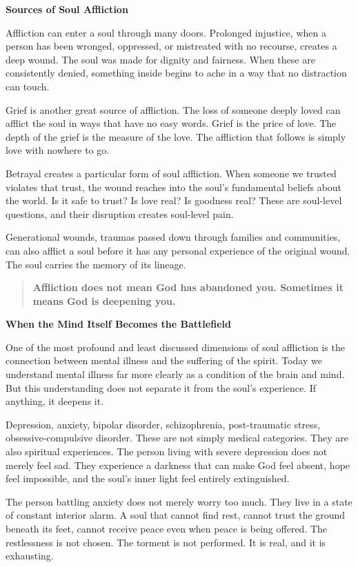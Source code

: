 \textbf{Sources of Soul Affliction}

Affliction can enter a soul through many doors. Prolonged injustice,
when a person has been wronged, oppressed, or mistreated with no
recourse, creates a deep wound. The soul was made for dignity and
fairness. When these are consistently denied, something inside begins to
ache in a way that no distraction can touch.

Grief is another great source of affliction. The loss of someone deeply
loved can afflict the soul in ways that have no easy words. Grief is the
price of love. The depth of the grief is the measure of the love. The
affliction that follows is simply love with nowhere to go.

Betrayal creates a particular form of soul affliction. When someone we
trusted violates that trust, the wound reaches into the soul's
fundamental beliefs about the world. Is it safe to trust? Is love real?
Is goodness real? These are soul-level questions, and their disruption
creates soul-level pain.

Generational wounds, traumas passed down through families and
communities, can also afflict a soul before it has any personal
experience of the original wound. The soul carries the memory of its
lineage.

\begin{quote}
\textbf{Affliction does not mean God has abandoned you. Sometimes it
means God is deepening you.}
\end{quote}

\textbf{When the Mind Itself Becomes the Battlefield}

One of the most profound and least discussed dimensions of soul
affliction is the connection between mental illness and the suffering of
the spirit. Today we understand mental illness far more clearly as a
condition of the brain and mind. But this understanding does not
separate it from the soul's experience. If anything, it deepens it.

Depression, anxiety, bipolar disorder, schizophrenia, post-traumatic
stress, obsessive-compulsive disorder. These are not simply medical
categories. They are also spiritual experiences. The person living with
severe depression does not merely feel sad. They experience a darkness
that can make God feel absent, hope feel impossible, and the soul's
inner light feel entirely extinguished.

The person battling anxiety does not merely worry too much. They live in
a state of constant interior alarm. A soul that cannot find rest, cannot
trust the ground beneath its feet, cannot receive peace even when peace
is being offered. The restlessness is not chosen. The torment is not
performed. It is real, and it is exhausting.

